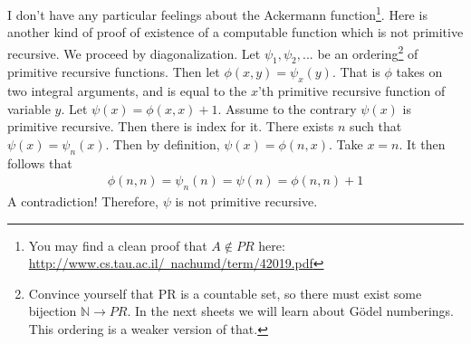 \documentclass[11pt]{article}
\begin{document}
I don't have any particular feelings about the Ackermann function\footnote{You may find a clean proof that $A \not \in PR$ here: \href{http://www.cs.tau.ac.il/~nachumd/term/42019.pdf}{http://www.cs.tau.ac.il/~nachumd/term/42019.pdf}}. Here is another kind of proof of existence of a computable function which is not primitive recursive. We proceed by diagonalization. Let $\psi_1,\psi_2,...$ be an ordering\footnote{Convince yourself that PR is a countable set, so there must exist some bijection $\mathbb{N} \rightarrow PR$. In the next sheets we will learn about G\"odel numberings. This ordering is a weaker version of that.} of primitive recursive functions.  Then let $\phi(x,y) = \psi_x(y)$. That is $\phi$ takes on two integral arguments, and is equal to the $x$'th primitive recursive function of variable $y$. Let $\psi(x) = \phi(x,x) + 1$. Assume to the contrary $\psi(x)$ is primitive recursive.  Then there is index for it. There exists $n$ such that $\psi(x) = \psi_n(x)$. Then by definition, $\psi(x) = \phi(n,x)$. Take $x = n$. It then follows that
\begin{align}
    \phi(n,n) = \psi_n(n) = \psi(n) = \phi(n,n) + 1
\end{align} A contradiction! Therefore, $\psi$ is not primitive recursive. 
\newpage
\end{document}

